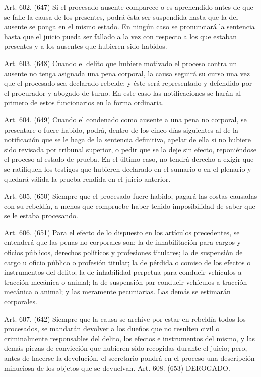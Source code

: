     Art. 602. (647) Si el procesado ausente comparece o es aprehendido antes de que se falle la causa de los presentes, podrá ésta ser suspendida hasta que la del ausente se ponga en el mismo estado. En ningún caso se pronunciará la sentencia hasta que el juicio pueda ser fallado a la vez con respecto a los que estaban presentes y a los ausentes que hubieren sido habidos.


    Art. 603. (648) Cuando el delito que hubiere motivado el proceso contra un ausente no tenga asignada una pena corporal, la causa seguirá su curso una vez que el procesado sea declarado rebelde; y éste será representado y defendido por el procurador y abogado de turno. En este caso las notificaciones se harán al primero de estos funcionarios en la forma ordinaria.

     


    Art. 604. (649) Cuando el condenado como ausente a una pena no corporal, se presentare o fuere habido, podrá, dentro de los cinco días siguientes al de la notificación que se le haga de la sentencia definitiva, apelar de ella si no hubiere sido revisada por tribunal superior, o pedir que se la deje sin efecto, reponiéndose el proceso al estado de prueba.
    En el último caso, no tendrá derecho a exigir que se ratifiquen los testigos que hubieren declarado en el sumario o en el plenario y quedará válida la prueba rendida en el juicio anterior.

    Art. 605. (650) Siempre que el procesado fuere habido, pagará las costas causadas con su rebeldía, a menos que compruebe haber tenido imposibilidad de saber que se le estaba procesando.

    Art. 606. (651) Para el efecto de lo dispuesto en los artículos precedentes, se entenderá que las penas no corporales son: la de inhabilitación para cargos y oficios públicos, derechos políticos y profesiones titulares; la de suspensión de cargo u oficio público o profesión titular; la de pérdida o comiso de los efectos o instrumentos del delito; la de inhabilidad perpetua para conducir vehículos a tracción mecánica o animal; la de suspensión par conducir vehículos a tracción mecánica o animal; y las meramente pecuniarias.
    Las demás se estimarán corporales.

    Art. 607. (642) Siempre que la causa se archive por estar en rebeldía todos los procesados, se mandarán devolver a los dueños que no resulten civil o criminalmente responsables del delito, los efectos e instrumentos del mismo, y las demás piezas de convicción que hubieren sido recogidas durante el juicio; pero, antes de hacerse la devolución, el secretario pondrá en el proceso una descripción minuciosa de los objetos que se devuelvan.
    Art. 608. (653) DEROGADO.-


